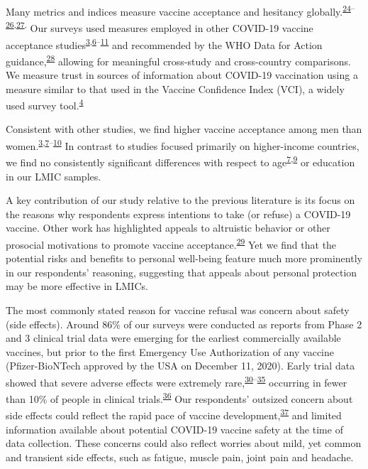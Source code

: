 \documentclass[
  12pt,
]{article}
\begin{document}
Many metrics and indices measure vaccine acceptance and hesitancy globally.\textsuperscript{\protect\hyperlink{ref-betsch2018beyond}{24}--\protect\hyperlink{ref-shapiro2018vaccine}{26},\protect\hyperlink{ref-gilkey2014vaccination}{27},} Our surveys used measures employed in other COVID-19 vaccine acceptance studies\textsuperscript{\protect\hyperlink{ref-wouters2021challenges}{3},\protect\hyperlink{ref-Malik2020}{6}--\protect\hyperlink{ref-lazarus2020nature}{11}} and recommended by the WHO Data for Action guidance,\textsuperscript{\protect\hyperlink{ref-whodata}{28}} allowing for meaningful cross-study and cross-country comparisons. We measure trust in sources of information about COVID-19 vaccination using a measure similar to that used in the Vaccine Confidence Index (VCI), a widely used survey tool.\textsuperscript{\protect\hyperlink{ref-defigueiredo2020lancet}{4}}

Consistent with other studies, we find higher vaccine acceptance among men than women.\textsuperscript{\protect\hyperlink{ref-wouters2021challenges}{3},\protect\hyperlink{ref-kreps2020factors}{7}--\protect\hyperlink{ref-fisher2020attitudes}{10}} In contrast to studies focused primarily on higher-income countries, we find no consistently significant differences with respect to age\textsuperscript{\protect\hyperlink{ref-kreps2020factors}{7},\protect\hyperlink{ref-dror2020vaccine}{9}} or education in our LMIC samples.

A key contribution of our study relative to the previous literature is its focus on the reasons why respondents express intentions to take (or refuse) a COVID-19 vaccine. Other work has highlighted appeals to altruistic behavior or other prosocial motivations to promote vaccine acceptance.\textsuperscript{\protect\hyperlink{ref-chou2020considering}{29}} Yet we find that the potential risks and benefits to personal well-being feature much more prominently in our respondents' reasoning, suggesting that appeals about personal protection may be more effective in LMICs.

The most commonly stated reason for vaccine refusal was concern about safety (side effects). Around 86\% of our surveys were conducted as reports from Phase 2 and 3 clinical trial data were emerging for the earliest commercially available vaccines, but prior to the first Emergency Use Authorization of any vaccine (Pfizer-BioNTech approved by the USA on December 11, 2020). Early trial data showed that severe adverse effects were extremely rare,\textsuperscript{\protect\hyperlink{ref-mulligan2020phase}{30}--\protect\hyperlink{ref-polack2020safety}{35}} occurring in fewer than 10\% of people in clinical trials.\textsuperscript{\protect\hyperlink{ref-wadman2020public}{36}} Our respondents' outsized concern about side effects could reflect the rapid pace of vaccine development,\textsuperscript{\protect\hyperlink{ref-callaway2020russia}{37}} and limited information available about potential COVID-19 vaccine safety at the time of data collection. These concerns could also reflect worries about mild, yet common and transient side effects, such as fatigue, muscle pain, joint pain and headache.
\end{document}

